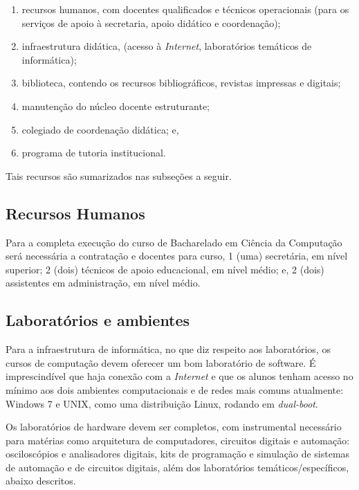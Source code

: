 \documentclass[
	12pt,				%
	openright,			%
  oneside,     %
	a4paper,			%
	english,			%
	french,				%
	spanish,			%
	brazil				%
	]{abntex2}
\begin{document}
\begin{enumerate}
  \item recursos humanos, com docentes qualificados e técnicos operacionais
  (para os serviços de apoio à secretaria, apoio didático e coordenação);
  \item infraestrutura didática, (acesso à \textit{Internet}, laboratórios
  temáticos de informática);
  \item biblioteca, contendo os recursos bibliográficos, revistas impressas e
  digitais;
  \item manutenção do núcleo docente estruturante; 
  \item colegiado de coordenação didática; e,
  \item programa de tutoria institucional.
\end{enumerate} 

Tais recursos são sumarizados nas subseções a seguir.



\subsection{Recursos Humanos}

Para a completa execução do curso de Bacharelado em  Ciência da Computação será
necessária a contratação e docentes para curso, 1 (uma)  secretária, em nível
superior; 2 (dois) técnicos de apoio educacional, em nível médio; e, 2 (dois)
assistentes em administração, em nível médio.

\subsection{Laboratórios e ambientes}

Para a infraestrutura de informática, no que diz respeito aos laboratórios, os
cursos de computação devem oferecer um bom laboratório de software.  É
imprescindível que haja conexão com a \textit{Internet} e que os alunos tenham
acesso no mínimo aos dois ambientes computacionais e de redes mais comuns
atualmente: Windows 7 e UNIX, como uma distribuição Linux, rodando em
\textit{dual-boot}. 

Os laboratórios de hardware devem ser completos, com
instrumental  necessário para  matérias como arquitetura de computadores, 
circuitos digitais e automação: osciloscópios e analisadores digitais,  kits de
programação e simulação de sistemas de automação e de circuitos digitais, além
dos laboratórios temáticos/específicos, abaixo descritos.
\end{document}
